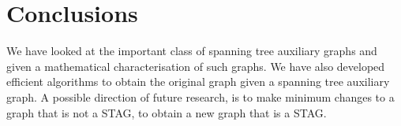 \documentclass{llncs}
\begin{document}
\section{Conclusions}\label{secconcl}
We have looked at the important class of spanning tree auxiliary graphs and given a mathematical characterisation of such graphs. We have also developed efficient algorithms to obtain the original graph given a spanning tree auxiliary graph. A possible direction of future research, is to make minimum changes to a graph that is not a STAG, to obtain a new graph that is a STAG.

 
%
%
%
\end{document}
